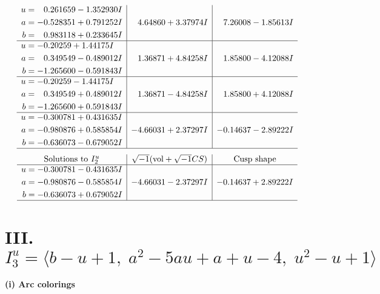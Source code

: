 \documentclass[1p]{elsarticle_modified}
\theoremstyle{definition}
\newcommand{\I}{\sqrt{-1}}
\begin{document}
$$\begin{array}{c|c|c}
\begin{aligned}
u &= \phantom{-}0.261659 - 1.352930 I \\
a &= -0.528351 + 0.791252 I \\
b &= \phantom{-}0.983118 + 0.233645 I\end{aligned}
 & \phantom{-}4.64860 + 3.37974 I & \phantom{-}7.26008 - 1.85613 I \\ \hline\begin{aligned}
u &= -0.20259 + 1.44175 I \\
a &= \phantom{-}0.349549 - 0.489012 I \\
b &= -1.265600 - 0.591843 I\end{aligned}
 & \phantom{-}1.36871 + 4.84258 I & \phantom{-}1.85800 - 4.12088 I \\ \hline\begin{aligned}
u &= -0.20259 - 1.44175 I \\
a &= \phantom{-}0.349549 + 0.489012 I \\
b &= -1.265600 + 0.591843 I\end{aligned}
 & \phantom{-}1.36871 - 4.84258 I & \phantom{-}1.85800 + 4.12088 I \\ \hline\begin{aligned}
u &= -0.300781 + 0.431635 I \\
a &= -0.980876 + 0.585854 I \\
b &= -0.636073 - 0.679052 I\end{aligned}
 & -4.66031 + 2.37297 I & -0.14637 - 2.89222 I\\
 \hline 
 \end{array}$$\newpage$$\begin{array}{c|c|c}  
\text{Solutions to }I^u_{2}& \I (\text{vol} + \sqrt{-1}CS) & \text{Cusp shape}\\
 \hline 
\begin{aligned}
u &= -0.300781 - 0.431635 I \\
a &= -0.980876 - 0.585854 I \\
b &= -0.636073 + 0.679052 I\end{aligned}
 & -4.66031 - 2.37297 I & -0.14637 + 2.89222 I\\
 \hline 
 \end{array}$$\newpage\newpage\renewcommand{\arraystretch}{1}
\centering \section*{III. $I^u_{3}= \langle b- u+1,\;a^2-5 a u+a+u-4,\;u^2- u+1 \rangle$}
\flushleft \textbf{(i) Arc colorings}\\
\end{document}
